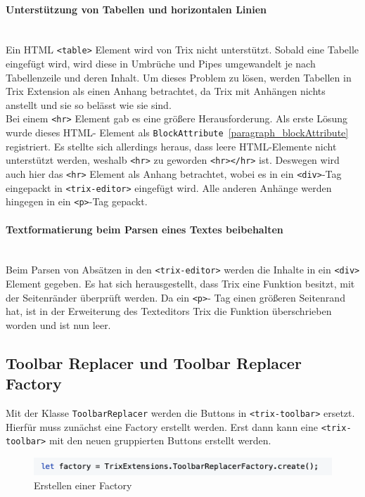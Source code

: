 \paragraph{Unterstützung von Tabellen und horizontalen Linien}
\mbox{}\\
Ein HTML \texttt{<table>} Element wird von Trix nicht unterstützt. Sobald eine Tabelle eingefügt wird, wird diese in 
Umbrüche und Pipes umgewandelt je nach Tabellenzeile und deren Inhalt. Um dieses Problem zu lösen, werden 
Tabellen in Trix Extension als einen Anhang betrachtet, da Trix mit Anhängen nichts anstellt und sie so belässt wie 
sie sind.\\
Bei einem \texttt{<hr>} Element gab es eine größere Herausforderung. Als erste Lösung wurde dieses HTML-
Element als \texttt{BlockAttribute}~\ref{paragraph_blockAttribute} registriert. Es stellte sich allerdings heraus, dass 
leere HTML-Elemente nicht unterstützt werden, weshalb \texttt{<hr>} zu geworden \texttt{<hr></hr>} ist. Deswegen 
wird auch hier das \texttt{<hr>} Element als Anhang betrachtet, wobei es in ein \texttt{<div>}-Tag eingepackt in 
\texttt{<trix-editor>} eingefügt wird. Alle anderen Anhänge werden hingegen in ein \texttt{<p>}-Tag gepackt.

\paragraph{Textformatierung beim Parsen eines Textes beibehalten}
\mbox{}\\
Beim Parsen von Absätzen in den \texttt{<trix-editor>} werden die Inhalte in ein \texttt{<div>} Element gegeben. Es 
hat sich herausgestellt, dass Trix eine Funktion besitzt, mit der Seitenränder überprüft werden. Da ein \texttt{<p>}-
Tag einen größeren Seitenrand hat, ist in der Erweiterung des Texteditors Trix die Funktion überschrieben worden 
und ist nun leer.

\subsection{Toolbar Replacer und Toolbar Replacer Factory}
\label{subsec_toolbar_replacer_factory}

Mit der Klasse \texttt{ToolbarReplacer} werden die Buttons in \texttt{<trix-toolbar>} ersetzt. Hierfür muss zunächst eine Factory erstellt werden. Erst dann kann eine \texttt{<trix-toolbar>} mit den neuen gruppierten Buttons erstellt werden.

\begin{figure}[H]
\begin{center}
	\includegraphics[scale=.7]{images/toolbar_replacer_factory.png}
\end{center}
	\caption{Erstellen einer Factory} 
\end{figure}

